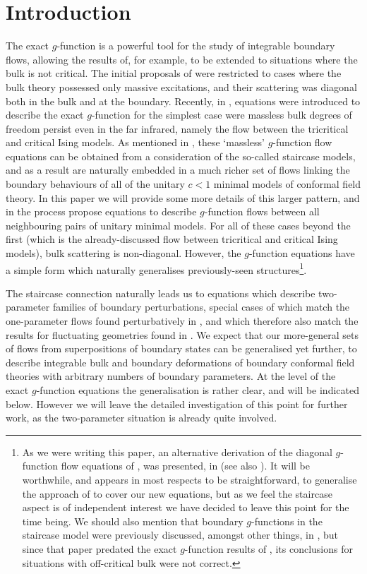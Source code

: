 \documentclass[11pt]{article}
\newcommand{\resection}[1]{\setcounter{equation}{0}\section{#1}}
\begin{document}
\resection{Introduction}
%
The exact $g$-function \cite{Dorey:2004xk,Dorey:2005ak} is a powerful 
tool for the study of integrable boundary flows, allowing the 
results of, 
for example, \cite{Tsvelick:1985,Affleck:1991tk} to be extended
to situations where the bulk is not critical.
The initial proposals of \cite{Dorey:2004xk} were restricted
to cases where the bulk theory possessed only massive excitations, and
their scattering was diagonal both in the bulk and at the boundary.
Recently, in \cite{Dorey:2009vg},
equations were introduced to describe the exact $g$-function
for the simplest case were massless bulk degrees of freedom
persist even in the far infrared, namely the flow between the
tricritical and critical Ising models. As mentioned in 
\cite{Dorey:2009vg},
these `massless' $g$-function
flow equations can be obtained from a consideration
of the so-called staircase models, and as a result are naturally embedded
in a much richer set of flows linking the boundary behaviours of
all of the unitary $c<1$ minimal 
models of conformal field theory. In this paper we will provide
some more details of this larger pattern, and in the process propose
equations to describe $g$-function flows between
all neighbouring pairs of unitary minimal models. For all of
these cases beyond the first (which is the already-discussed flow
between tricritical and critical Ising models), bulk scattering is
non-diagonal. However, the $g$-function equations have a simple form
which naturally generalises previously-seen 
structures\footnote{As we were writing this paper, an 
alternative
derivation of the diagonal $g$-function flow equations of 
\cite{Dorey:2004xk,Dorey:2005ak,Dorey:2009vg}, was presented, 
in \cite{Pozsgay:2010tv} (see also
\cite{Woynarovich:2010wt}).  It will be worthwhile, and appears in 
most respects to be straightforward, to generalise the approach 
of \cite{Pozsgay:2010tv} to cover our 
new equations, but as we feel the staircase
aspect is of independent interest we have decided to leave this
point for the time being. We should also mention that boundary
$g$-functions in the staircase model were previously discussed,
amongst other things, in
\cite{Lesage:1998qf}, but since that paper predated the exact
$g$-function results of \cite{Dorey:2004xk}, its conclusions for
situations with off-critical bulk were not correct.}.

The staircase connection naturally leads us to equations which
describe two-parameter
families of boundary perturbations, special cases of which
match the one-parameter flows found perturbatively in 
\cite{Fredenhagen:2009tn}, and which therefore also match the results
for fluctuating geometries found in \cite{Bourgine:2009zt}.
We expect that our more-general sets of flows from superpositions of 
boundary states can be generalised yet further, to describe
integrable bulk and boundary deformations of boundary 
conformal field theories with arbitrary numbers of boundary parameters. 
At the level of the exact $g$-function
equations the generalisation is rather clear, and will be indicated
below. However we will leave the detailed investigation of this point
for further work, as the two-parameter situation is already quite
involved. 
\end{document}
